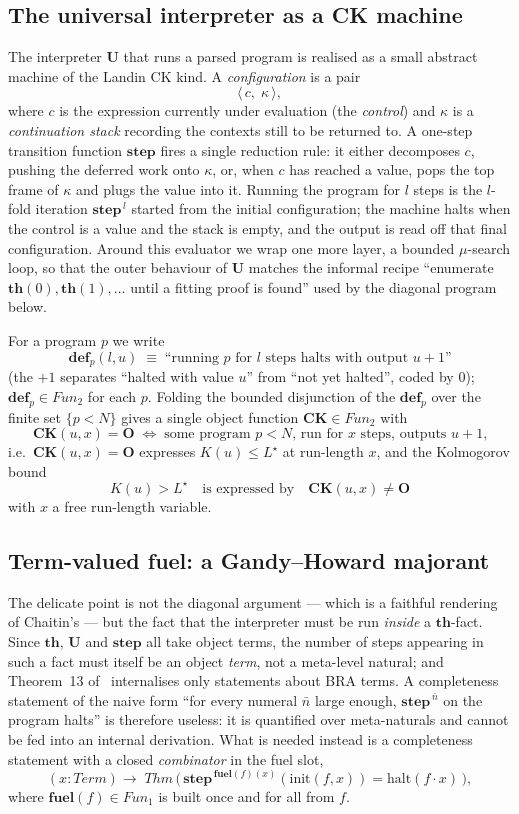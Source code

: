 \documentclass[11pt]{article}
\theoremstyle{plain}
\theoremstyle{definition}
\theoremstyle{remark}
\newcommand{\thmT}{\mathbf{th}}
\newcommand{\evalU}{\mathbf{U}}
\newcommand{\stepU}{\mathbf{step}}
\newcommand{\defp}{\mathbf{def}}
\newcommand{\CK}{\mathbf{CK}}
\newcommand{\Kc}{K}
\newcommand{\Fun}{\mathit{Fun}}
\newcommand{\Term}{\mathit{Term}}
\newcommand{\fuelG}{\mathbf{fuel}}
\newcommand{\Lstar}{L^{\!\star}}
\begin{document}
\subsection{The universal interpreter as a CK machine}

The interpreter $\evalU$ that runs a parsed program is realised as a small
abstract machine of the Landin CK kind. A \emph{configuration} is a pair
\[
  \langle\, c,\; \kappa \,\rangle,
\]
where $c$ is the expression currently under evaluation (the
\emph{control}) and $\kappa$ is a \emph{continuation stack} recording the
contexts still to be returned to. A one-step transition function $\stepU$
fires a single reduction rule: it either decomposes $c$, pushing the
deferred work onto $\kappa$, or, when $c$ has reached a value, pops the
top frame of $\kappa$ and plugs the value into it. Running the program
for $l$ steps is the $l$-fold iteration $\stepU^{\,l}$ started from the
initial configuration; the machine halts when the control is a value and
the stack is empty, and the output is read off that final configuration.
Around this evaluator we wrap one more layer, a bounded
$\mu$-search loop, so that the outer behaviour of $\evalU$ matches the
informal recipe ``enumerate $\thmT(0), \thmT(1), \dots$ until a fitting
proof is found'' used by the diagonal program below.

For a program $p$ we write
\[
  \defp_p(l, u) \;\equiv\; \text{``running $p$ for $l$ steps halts with output $u+1$''}
\]
(the $+1$ separates ``halted with value $u$'' from ``not yet halted'',
coded by $0$); $\defp_p \in \Fun_2$ for each $p$. Folding the bounded
disjunction of the $\defp_p$ over the finite set $\{p<N\}$ gives a single
object function $\CK \in \Fun_2$ with
\[
  \CK(u, x) = \mathbf{O}
  \;\Longleftrightarrow\;
  \text{some program $p<N$, run for $x$ steps, outputs $u+1$,}
\]
i.e.\ $\CK(u,x)=\mathbf{O}$ expresses $\Kc(u)\le\Lstar$ at run-length
$x$, and the Kolmogorov bound
\[
  \Kc(u) > \Lstar \quad\text{is expressed by}\quad \CK(u,x)\neq\mathbf{O}
\]
with $x$ a free run-length variable.

\subsection{Term-valued fuel: a Gandy--Howard majorant}
\label{sec:fuel}

The delicate point is not the diagonal argument --- which is a faithful
rendering of Chaitin's --- but the fact that the interpreter must be run
\emph{inside} a $\thmT$-fact. Since $\thmT$, $\evalU$ and $\stepU$ all
take object terms, the number of steps appearing in such a fact must
itself be an object \emph{term}, not a meta-level natural; and
Theorem~13 of~\cite{arGII} internalises only statements about BRA terms.
A completeness statement of the naive form ``for every numeral $\bar n$
large enough, $\stepU^{\,\bar n}$ on the program halts'' is therefore
useless: it is quantified over meta-naturals and cannot be fed into an
internal derivation. What is needed instead is a completeness statement
with a closed \emph{combinator} in the fuel slot,
\[
  (x:\Term)\to\;\mathit{Thm}\,
     \bigl(\,\stepU^{\,\fuelG(f)(x)}(\text{init}(f,x)) = \text{halt}(f\cdot x)\,\bigr),
\]
where $\fuelG(f)\in\Fun_1$ is built once and for all from $f$.
\end{document}
